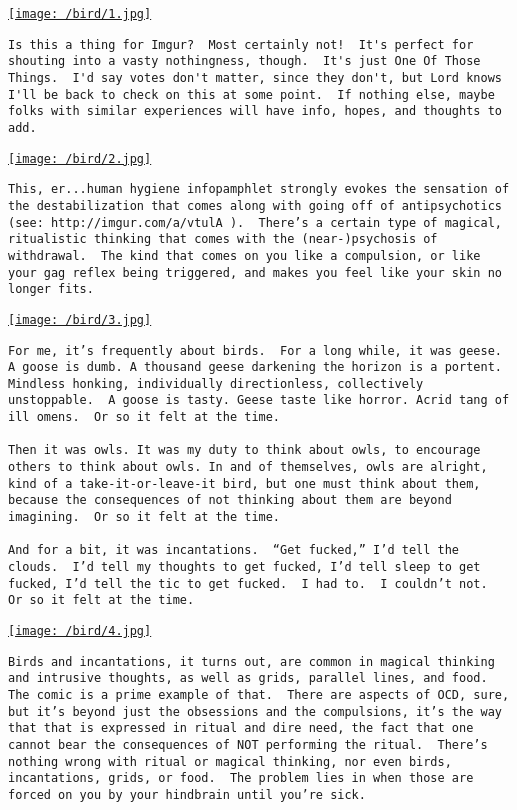\href{/bird/1.jpg}{\texttt{[image: /bird/1.jpg]}}

\begin{verbatim}
Is this a thing for Imgur?  Most certainly not!  It's perfect for shouting into a vasty nothingness, though.  It's just One Of Those Things.  I'd say votes don't matter, since they don't, but Lord knows I'll be back to check on this at some point.  If nothing else, maybe folks with similar experiences will have info, hopes, and thoughts to add.
\end{verbatim}

\href{/bird/2.jpg}{\texttt{[image: /bird/2.jpg]}}

\begin{verbatim}
This, er...human hygiene infopamphlet strongly evokes the sensation of the destabilization that comes along with going off of antipsychotics (see: http://imgur.com/a/vtulA ).  There’s a certain type of magical, ritualistic thinking that comes with the (near-)psychosis of withdrawal.  The kind that comes on you like a compulsion, or like your gag reflex being triggered, and makes you feel like your skin no longer fits.
\end{verbatim}

\href{/bird/3.jpg}{\texttt{[image: /bird/3.jpg]}}

\begin{verbatim}
For me, it’s frequently about birds.  For a long while, it was geese.  A goose is dumb. A thousand geese darkening the horizon is a portent. Mindless honking, individually directionless, collectively unstoppable.  A goose is tasty. Geese taste like horror. Acrid tang of ill omens.  Or so it felt at the time.

Then it was owls. It was my duty to think about owls, to encourage others to think about owls. In and of themselves, owls are alright, kind of a take-it-or-leave-it bird, but one must think about them, because the consequences of not thinking about them are beyond imagining.  Or so it felt at the time.

And for a bit, it was incantations.  “Get fucked,” I’d tell the clouds.  I’d tell my thoughts to get fucked, I’d tell sleep to get fucked, I’d tell the tic to get fucked.  I had to.  I couldn’t not.  Or so it felt at the time.
\end{verbatim}

\href{/bird/4.jpg}{\texttt{[image: /bird/4.jpg]}}

\begin{verbatim}
Birds and incantations, it turns out, are common in magical thinking and intrusive thoughts, as well as grids, parallel lines, and food.  The comic is a prime example of that.  There are aspects of OCD, sure, but it’s beyond just the obsessions and the compulsions, it’s the way that that is expressed in ritual and dire need, the fact that one cannot bear the consequences of NOT performing the ritual.  There’s nothing wrong with ritual or magical thinking, nor even birds, incantations, grids, or food.  The problem lies in when those are forced on you by your hindbrain until you’re sick.
\end{verbatim}

